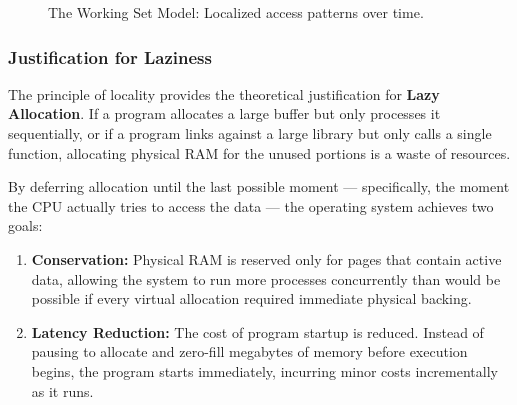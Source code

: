 \documentclass[a4paper,10pt,twoside]{report}
\theoremstyle{definition}
\begin{document}
\begin{figure}[htbp]
\centering
{}
\caption{The Working Set Model: Localized access patterns over time.}
\label{fig:working_set}
\end{figure}

\subsubsection{Justification for Laziness}

The principle of locality provides the theoretical justification for \textbf{Lazy Allocation}. If a program allocates a large buffer but only processes it sequentially, or if a program links against a large library but only calls a single function, allocating physical RAM for the unused portions is a waste of resources. 

By deferring allocation until the last possible moment --- specifically, the moment the CPU actually tries to access the data --- the operating system achieves two goals:
\begin{enumerate}
    \item \textbf{Conservation:} Physical RAM is reserved only for pages that contain active data, allowing the system to run more processes concurrently than would be possible if every virtual allocation required immediate physical backing.
    \item \textbf{Latency Reduction:} The cost of program startup is reduced. Instead of pausing to allocate and zero-fill megabytes of memory before execution begins, the program starts immediately, incurring minor costs incrementally as it runs.
\end{enumerate}
\end{document}
